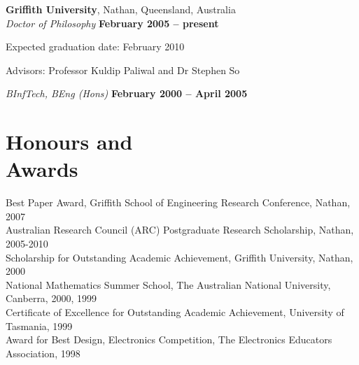 \documentclass[margin,line]{resume}
\begin{document}
\begin{resume}
    \textbf{Griffith University}, Nathan, Queensland, Australia \vspace{2mm}\\\vspace{1mm}%
    \textsl{Doctor of Philosophy} \hfill \textbf{ February 2005 -- present}\vspace{-3mm}\\\vspace{-1mm}%
    \begin{list2}
        \item Expected graduation date: February 2010
        \item Advisors:  Professor Kuldip Paliwal and Dr Stephen So
    \end{list2}\vspace{-1.5mm}
    \textsl{BInfTech, BEng (Hons)} \hfill \textbf{February 2000 -- April 2005}\vspace{-3mm}\\\vspace{-1mm}%


    \section{\mysidestyle Honours and\\Awards} 

    Best Paper Award, Griffith School of Engineering Research Conference, Nathan, 2007              \vspace{1mm}\\%
    Australian Research Council (ARC) Postgraduate Research Scholarship, Nathan, 2005-2010          \vspace{1mm}\\%
    Scholarship for Outstanding Academic Achievement, Griffith University, Nathan, 2000             \vspace{1mm}\\%
    National Mathematics Summer School, The Australian National University, Canberra, 2000, 1999    \vspace{1mm}\\%
    Certificate of Excellence for Outstanding Academic Achievement, University of Tasmania, 1999    \vspace{1mm}\\%
    Award for Best Design, Electronics Competition, The Electronics Educators Association, 1998 



\end{resume}
\end{document}
